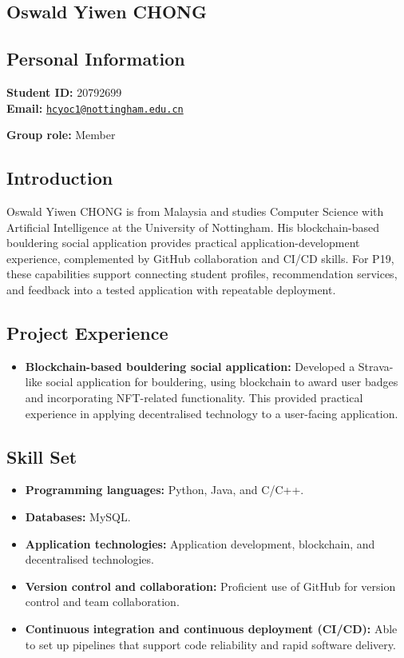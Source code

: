 \documentclass[a4paper,12pt]{article}
\newcommand{\PersonalInformation}[2]{%
  \subsection*{Personal Information}
  \if\relax\detokenize{#1}\relax\else
  \noindent\textbf{Student ID:} #1\\
  \fi
  \textbf{Email:} #2\par
}
\begin{document}
\subsection{Oswald Yiwen CHONG}
\PersonalInformation{20792699}{\href{mailto:hcyoc1@nottingham.edu.cn}{\nolinkurl{hcyoc1@nottingham.edu.cn}}}
\noindent\textbf{Group role:} Member\par

\subsection*{Introduction}
Oswald Yiwen CHONG is from Malaysia and studies Computer Science with Artificial Intelligence at the University of Nottingham. His blockchain-based bouldering social application provides practical application-development experience, complemented by GitHub collaboration and CI/CD skills. For P19, these capabilities support connecting student profiles, recommendation services, and feedback into a tested application with repeatable deployment.

\subsection*{Project Experience}
\begin{itemize}
  \item \textbf{Blockchain-based bouldering social application:} Developed a Strava-like social application for bouldering, using blockchain to award user badges and incorporating NFT-related functionality. This provided practical experience in applying decentralised technology to a user-facing application.
\end{itemize}

\subsection*{Skill Set}
\begin{itemize}
  \item \textbf{Programming languages:} Python, Java, and C/C++.
  \item \textbf{Databases:} MySQL.
  \item \textbf{Application technologies:} Application development, blockchain, and decentralised technologies.
  \item \textbf{Version control and collaboration:} Proficient use of GitHub for version control and team collaboration.
  \item \textbf{Continuous integration and continuous deployment (CI/CD):} Able to set up pipelines that support code reliability and rapid software delivery.
\end{itemize}
\end{document}
